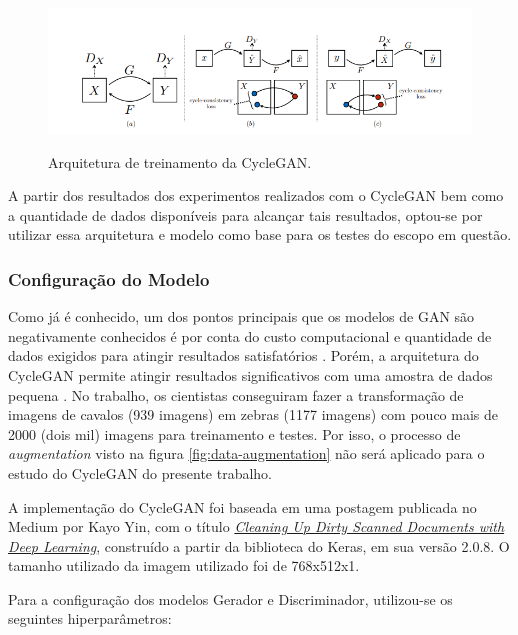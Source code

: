 \begin{figure}[H]
  \centering
  \caption{Arquitetura de treinamento da CycleGAN.}
  \includegraphics[scale=.57]{figuras/cycleconsistencyandlosses.png}
  \label{fig:cycleconsistencyandlosses}
\end{figure}

A partir dos resultados dos experimentos realizados com o CycleGAN bem como a quantidade de dados disponíveis para alcançar tais resultados, optou-se por utilizar essa arquitetura e modelo como base para os testes do escopo em questão.

\subsubsection{Configuração do Modelo}

Como já é conhecido, um dos pontos principais que os modelos de GAN são negativamente conhecidos é por conta do custo computacional e quantidade de dados exigidos para atingir resultados satisfatórios \cite{f8-decrappification}. Porém, a arquitetura do CycleGAN permite atingir resultados significativos com uma amostra de dados pequena \cite{cycle-gan}. No trabalho, os cientistas conseguiram fazer a transformação de imagens de cavalos (939 imagens) em zebras (1177 imagens) com pouco mais de 2000 (dois mil) imagens para treinamento e testes. Por isso, o processo de \textit{augmentation} visto na figura \ref{fig:data-augmentation} não será aplicado para o estudo do CycleGAN do presente trabalho.

A implementação do CycleGAN foi baseada em uma postagem publicada no Medium por Kayo Yin, com o título \href{https://medium.com/illuin/cleaning-up-dirty-scanned-documents-with-deep-learning-2e8e6de6cfa6}{\textit{Cleaning Up Dirty Scanned Documents with Deep Learning}}, construído a partir da biblioteca do Keras, em sua versão 2.0.8. O tamanho utilizado da imagem utilizado foi de 768x512x1.

Para a configuração dos modelos Gerador e Discriminador, utilizou-se os seguintes hiperparâmetros:

